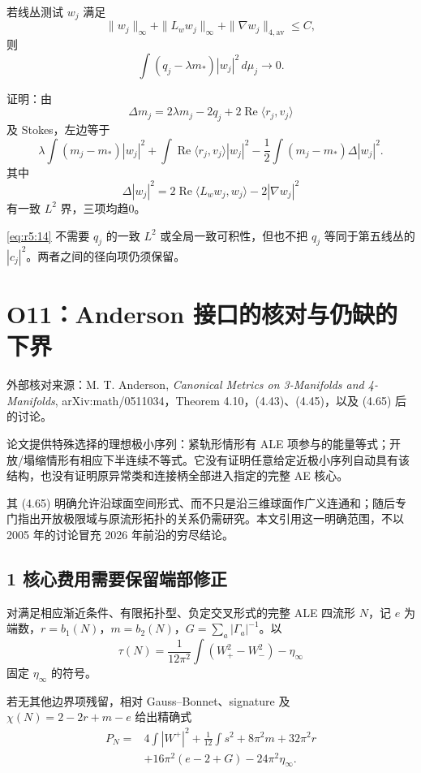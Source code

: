 \documentclass[UTF8,11pt,openany,oneside,fontset=none]{ctexbook}
\begin{document}
若线丛测试 \(w_j\) 满足 \[
 \|w_j\|_\infty+\|L_ww_j\|_\infty
 +\|\nabla w_j\|_{4,\mathrm{av}}\le C,
\] 则 \[
 \boxed{
 \int(q_j-\lambda m_*)|w_j|^2\,d\mu_j\longrightarrow0.
 }
\tag{5.14}\label{eq:r5:14}
\]

证明：由 \[
 \Delta m_j=2\lambda m_j-2q_j
       +2\operatorname{Re}\langle r_j,v_j\rangle
\] 及 Stokes，左边等于 \[
 \lambda\int(m_j-m_*)|w_j|^2
 +\int\operatorname{Re}\langle r_j,v_j\rangle|w_j|^2
 -\frac12\int(m_j-m_*)\Delta|w_j|^2.
\] 其中 \[
 \Delta|w_j|^2
 =2\operatorname{Re}\langle L_ww_j,w_j\rangle
       -2|\nabla w_j|^2
\] 有一致 \(L^2\) 界，三项均趋0。

\eqref{eq:r5:14} 不需要 \(q_j\) 的一致 \(L^2\) 或全局一致可积性，但也不把 \(q_j\) 等同于第五线丛的 \(|c_j|^2\)。两者之间的径向项仍须保留。

\section{O11：Anderson 接口的核对与仍缺的下界}\label{ch5:o11anderson-ux63a5ux53e3ux7684ux6838ux5bf9ux4e0eux4ecdux7f3aux7684ux4e0bux754c}

外部核对来源：M. T. Anderson, \emph{Canonical Metrics on 3-Manifolds and 4-Manifolds}, arXiv:math/0511034，Theorem 4.10，(4.43)、(4.45)，以及 (4.65) 后的讨论。

论文提供特殊选择的理想极小序列：紧轨形情形有 ALE 项参与的能量等式；开放/塌缩情形有相应下半连续不等式。它没有证明任意给定近极小序列自动具有该结构，也没有证明原异常类和连接柄全部进入指定的完整 AE 核心。

其 (4.65) 明确允许沿球面空间形式、而不只是沿三维球面作广义连通和；随后专门指出开放极限域与原流形拓扑的关系仍需研究。本文引用这一明确范围，不以 2005 年的讨论冒充 2026 年前沿的穷尽结论。

\subsection{1 核心费用需要保留端部修正}\label{ch5:ux6838ux5fc3ux8d39ux7528ux9700ux8981ux4fddux7559ux7aefux90e8ux4feeux6b63}

对满足相应渐近条件、有限拓扑型、负定交叉形式的完整 ALE 四流形 \(N\)，记 \(e\) 为端数，\(r=b_1(N)\)，\(m=b_2(N)\)，\(G=\sum_a|\Gamma_a|^{-1}\)。以 \[
 \tau(N)=\frac1{12\pi^2}\int(W_+^2-W_-^2)-\eta_\infty
\] 固定 \(\eta_\infty\) 的符号。

若无其他边界项残留，相对 Gauss--Bonnet、signature 及 \(\chi(N)=2-2r+m-e\) 给出精确式 \[
 \begin{aligned}
 P_N={}&4\int|W^+|^2+\frac1{12}\int s^2
 +8\pi^2m+32\pi^2r\\
 &+16\pi^2(e-2+G)-24\pi^2\eta_\infty.
 \end{aligned}
\tag{5.15}\label{eq:r5:15}
\]
\end{document}

